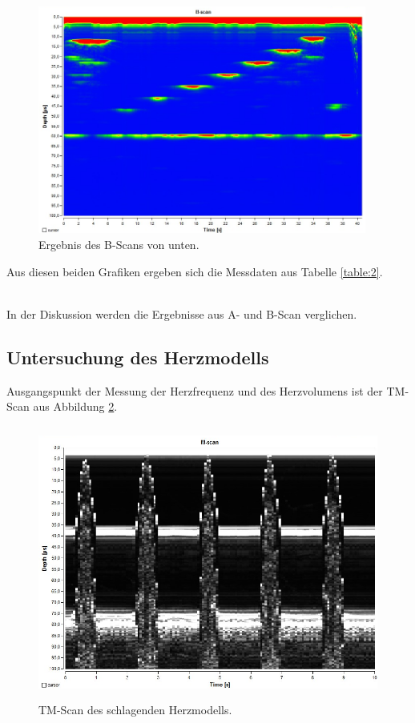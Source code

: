 \begin{figure}[H]
  \centering
  \includegraphics[height=7.5cm]{messdaten/b_unten.png}
  \caption{Ergebnis des B-Scans von unten.}
  \label{figure:2}
\end{figure}

Aus diesen beiden Grafiken ergeben sich die Messdaten aus Tabelle \ref{table:2}.

\\In der Diskussion werden die Ergebnisse aus A- und B-Scan verglichen.

\subsection{Untersuchung des Herzmodells}

Ausgangspunkt der Messung der Herzfrequenz und des Herzvolumens ist der TM-Scan aus Abbildung \ref{figure:3}.

\begin{figure}[H]
  \centering
  \includegraphics[height=9cm]{messdaten/herz.png}
  \caption{TM-Scan des schlagenden Herzmodells.}
  \label{figure:3}
\end{figure}

